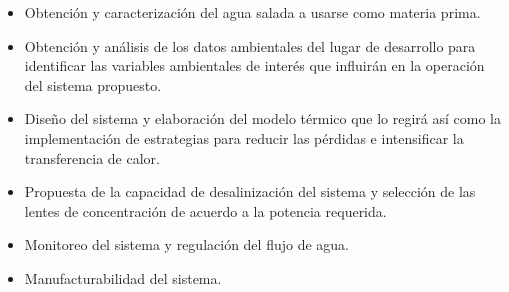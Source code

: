 	\begin{itemize}
		\item Obtención y caracterización del agua salada a usarse como materia prima.
		\item Obtención y análisis de los datos ambientales del lugar de desarrollo para identificar las variables ambientales de interés que influirán en la operación del sistema propuesto.
		\item Diseño del sistema y elaboración del modelo térmico que lo regirá así como la implementación de estrategias para reducir las pérdidas e intensificar la transferencia de calor.
		\item Propuesta de la capacidad de desalinización del sistema y selección de las lentes de concentración de acuerdo a la potencia requerida.
		\item Monitoreo del sistema y regulación del flujo de agua.
		\item Manufacturabilidad del sistema.
	\end{itemize}
	
%	
